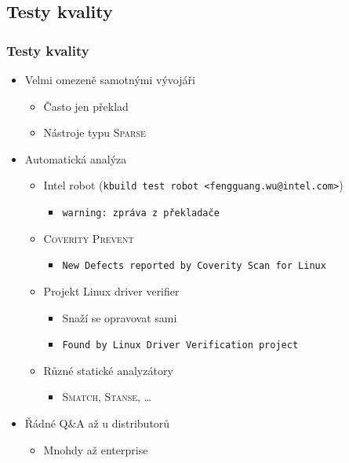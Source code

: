 \documentclass[xcolor=dvipsnames,handout]{beamer}
\begin{document}
\subsection{Testy kvality}

\begin{frame}
  \frametitle{Testy kvality}

  \begin{itemize}
    \item Velmi omezeně samotnými vývojáři
    \begin{itemize}
      \item Často jen překlad
      \item Nástroje typu \textsc{Sparse}
    \end{itemize}

    \pause

    \item Automatická analýza
    \begin{itemize}
      \item Intel robot (\texttt{kbuild test robot <fengguang.wu@intel.com>})
      \begin{itemize}
	\item \texttt{warning: zpráva z překladače}
      \end{itemize}

      \pause

      \item \textsc{Coverity Prevent}
      \begin{itemize}
	\item \texttt{New Defects reported by Coverity Scan for Linux}
      \end{itemize}

      \pause

      \item Projekt Linux driver verifier
      \begin{itemize}
	\item Snaží se opravovat sami
	\item \texttt{Found by Linux Driver Verification project}
      \end{itemize}

      \pause

      \item Různé statické analyzátory
      \begin{itemize}
	\item \textsc{Smatch}, \textsc{Stanse}, \dots
      \end{itemize}
    \end{itemize}

    \pause

    \item Řádné Q\&A až u distributorů
      \begin{itemize}
	\item Mnohdy až enterprise
      \end{itemize}
  \end{itemize}

\end{frame}
\end{document}
